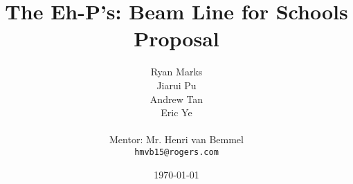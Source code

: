 \documentclass[12pt,letterpaper]{article}
\begin{document}
\title{The Eh-P's: Beam Line for Schools Proposal}
\author{
Ryan Marks\\
Jiarui Pu \\ 
Andrew Tan\\
Eric Ye\\
\\
Mentor: Mr. Henri van Bemmel\\
\normalsize{\texttt{hmvb15@rogers.com}}
}

\date{\today}
\maketitle

\end{document}
